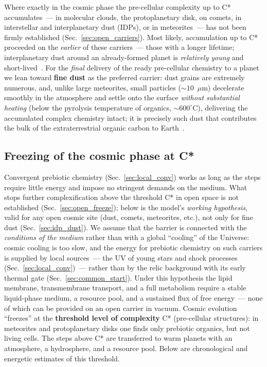 \documentclass[11pt,a4paper]{article}
\begin{document}
Where exactly in the cosmic phase the pre-cellular complexity up to C* accumulates~--- in molecular clouds, the protoplanetary disk, on comets, in interstellar and interplanetary dust (IDPs), or in meteorites~--- has not been firmly established (Sec.~\ref{sec:open_carriers}). Most likely, accumulation up to C* proceeded on the \emph{earlier} of these carriers~--- those with a longer lifetime; interplanetary dust around an already-formed planet is \emph{relatively young} and short-lived~\cite{Nesvorny2010,Grun1985}. For the \emph{final} delivery of the ready pre-cellular chemistry to a planet we lean toward \textbf{fine dust} as the preferred carrier: dust grains are extremely numerous, and, unlike large meteorites, small particles ($\sim 10$~$\mu$m) decelerate smoothly in the atmosphere and settle onto the surface \emph{without substantial heating} (below the pyrolysis temperature of organics, $\sim 600^\circ$C), delivering the accumulated complex chemistry intact; it is precisely such dust that contributes the bulk of the extraterrestrial organic carbon to Earth~\cite{Anders1989,ChybaSagan1992,Flynn2004}.

\subsection{Freezing of the cosmic phase at C*}
\label{sec:freeze}
\label{sec:cstar_dust}

Convergent prebiotic chemistry (Sec.~\ref{sec:local_conv}) works as long as the steps require little energy and impose no stringent demands on the medium. What stops further complexification above the threshold C* in open space is not established (Sec.~\ref{sec:open_freeze}); below is the model's \emph{working hypothesis}, valid for any open cosmic site (dust, comets, meteorites, etc.), not only for fine dust (Sec.~\ref{sec:idp_dust}). We assume that the barrier is connected with the \emph{conditions of the medium} rather than with a global ``cooling'' of the Universe: cosmic cooling is too slow, and the energy for prebiotic chemistry on such carriers is supplied by local sources~--- the UV of young stars and shock processes (Sec.~\ref{sec:local_conv})~--- rather than by the relic background with its early thermal gate (Sec.~\ref{sec:common_start}). Under this hypothesis the lipid membrane, transmembrane transport, and a full metabolism require a stable liquid-phase medium, a resource pool, and a sustained flux of free energy~--- none of which can be provided on an open carrier in vacuum. Cosmic evolution ``freezes'' at the \textbf{threshold level of complexity} C* (pre-cellular structures): in meteorites and protoplanetary disks one finds only prebiotic organics, but not living cells. The steps above C* are transferred to warm planets with an atmosphere, a hydrosphere, and a resource pool. Below are chronological and energetic estimates of this threshold.
\end{document}
